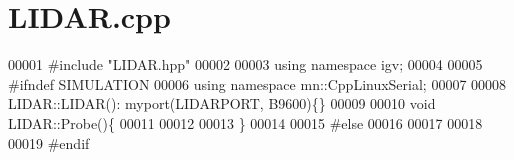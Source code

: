 \hypertarget{LIDAR_8cpp_source}{}\section{L\+I\+D\+A\+R.\+cpp}
\label{LIDAR_8cpp_source}

\begin{DoxyCode}
00001 \textcolor{preprocessor}{#}\textcolor{preprocessor}{include} \textcolor{preprocessor}{"LIDAR.hpp"}
00002 
00003 \textcolor{keyword}{using} \textcolor{keyword}{namespace} igv;
00004 
00005 \textcolor{preprocessor}{#}\textcolor{preprocessor}{ifndef} \textcolor{preprocessor}{SIMULATION}
00006 \textcolor{keyword}{using} \textcolor{keyword}{namespace} mn::CppLinuxSerial;
00007 
00008 LIDAR::LIDAR(): myport(LIDARPORT, B9600)\{\}
00009 
00010 \textcolor{keywordtype}{void} LIDAR::Probe()\{
00011 
00012 
00013 \}
00014 
00015 \textcolor{preprocessor}{#}\textcolor{preprocessor}{else}
00016 
00017 
00018 
00019 \textcolor{preprocessor}{#}\textcolor{preprocessor}{endif}
\end{DoxyCode}
